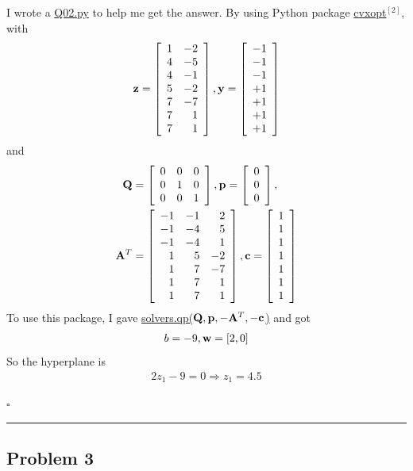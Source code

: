\documentclass[12pt]{article}
\newcommand*{\QEDB}{\hfill\ensuremath{\square}}
\newcommand{\SBrackets}[1]{\left[#1\right]}
\newcommand{\BF}[1]{{\bf#1}}
\newcommand{\Matrix}[2]{\SBrackets{\begin{array}{#1}#2\end{array}}}
\newcommand{\horrule}[1]{\rule{\linewidth}{#1}}
\begin{document}
I wrote a \url{Q02.py} to help me get the answer. By using Python package \url{cvxopt}$^{[2]}$, with
\begin{align}
\BF{z}=\Matrix{rr}{1&-2\\4&-5\\4&-1\\5&-2\\7&-7\\7&1\\7&1}, \BF{y}=\Matrix{c}{-1\\-1\\-1\\+1\\+1\\+1\\+1}
\end{align}
and
\begin{align}
\BF{Q}&=\Matrix{ccc}{0&0&0\\0&1&0\\0&0&1},\BF{p}=\Matrix{c}{0\\0\\0},\\
\BF{A}^T&=\Matrix{rrr}{-1&-1&2\\-1&-4&5\\-1&-4&1\\1&5&-2\\1&7&-7\\1&7&1\\1&7&1},\BF{c}=\Matrix{c}{1\\1\\1\\1\\1\\1\\1}
\end{align}
To use this package, I gave \url{solvers.qp(}$\BF{Q}, \BF{p}, -\BF{A}^T, -\BF{c}$\url{)} and got
\begin{align}
b=-9,\BF{w}=\SBrackets{2,0}
\end{align}
So the hyperplane is
\begin{align}
2z_1-9=0\Rightarrow z_1=4.5
\end{align}

\QEDB

\horrule{0.5pt}

\subsection*{Problem 3}
\end{document}
